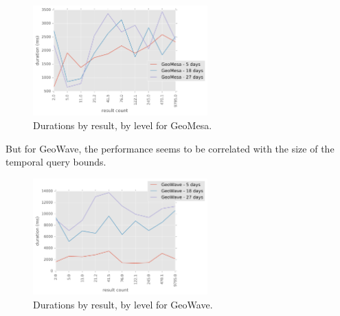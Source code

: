 \begin{figure}[h!tb]
  \centering
  \includegraphics[width=0.60\textwidth]{../docs/img/tracks/geomesa-duration-by-result-count-and-days.png}
  \caption{Durations by result, by level for GeoMesa.}
  \label{tracksgm}
\end{figure}

But for GeoWave, the performance seems to be correlated with the size of the temporal query bounds.

\begin{figure}[h!tb]
  \centering
  \includegraphics[width=0.60\textwidth]{../docs/img/tracks/geowave-duration-by-result-count-and-days.png}
  \caption{Durations by result, by level for GeoWave.}
  \label{tracksgw}
\end{figure}
